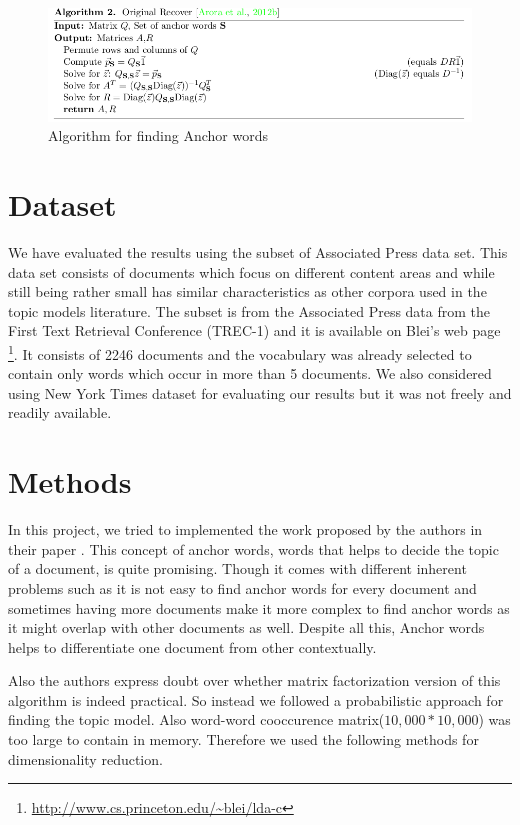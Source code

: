 \documentclass[a4paper,11pt]{article}
\begin{document}
\begin{figure}[htb]
\includegraphics[scale=0.5]{algorithm.png}
\caption{Algorithm for finding Anchor words }
\label{fig:algorithm}
\end{figure}

\section{Dataset}
We have evaluated the results using the subset of Associated Press data set. This data set consists of documents which focus on different content areas and while still being rather small has similar characteristics as other corpora used in the topic models literature. The subset is from the Associated Press data from the First Text Retrieval Conference (TREC-1) and it is available on Blei's web page \footnote{\url{http://www.cs.princeton.edu/~blei/lda-c}}. It consists of 2246 documents and the vocabulary was already selected to contain only words which occur in more than 5 documents. We also considered using New York Times dataset for evaluating our results but it was not freely and readily available.

\section{Methods}
In this project, we tried to implemented the work proposed by the authors in their paper \cite{tm}. This concept of anchor words, words that helps to decide the topic of a document, is quite promising. Though it comes with different inherent problems such as it is not easy to find anchor words for every document and sometimes having more documents make it more complex to find anchor words as it might overlap with other documents as well. Despite all this, Anchor words helps to differentiate one document from other contextually. 

Also the authors express doubt over whether matrix factorization version of this algorithm is indeed practical. So instead we followed a probabilistic approach for finding the topic model. Also word-word cooccurence matrix($10,000*10,000$) was too large to contain in memory. Therefore we used the following methods for dimensionality reduction.
\end{document}
